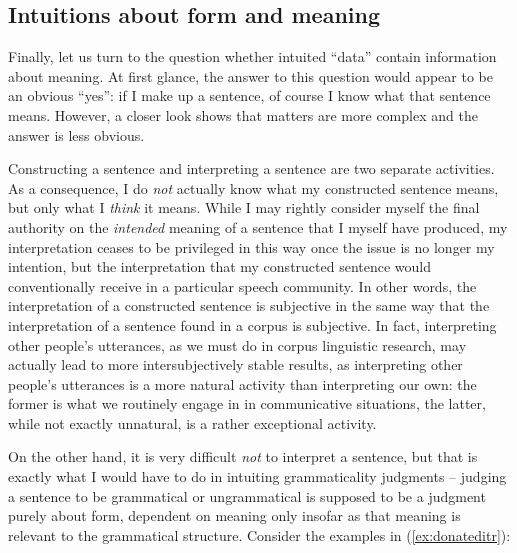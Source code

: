 \subsection{Intuitions about form and meaning}
\label{sec:intuitionsaboutformandmeaning}

Finally, let us turn to the question whether intuited  ``data'' contain information about meaning.  At first glance, the answer to this question would appear to be an obvious ``yes'': if I make up a sentence, of course I know what that sentence means. However, a closer look shows that matters are more complex and the answer is less obvious.

Constructing a sentence and interpreting a sentence are two separate activities. As a consequence, I do \textit{not} actually know what my constructed sentence means, but only what I \textit{think} it means. While I may rightly consider myself the final authority on the \textit{intended} meaning  of a sentence that I myself have produced, my interpretation ceases to be privileged in this way once the issue is no longer my intention, but the interpretation that my constructed sentence would conventionally  receive in a particular speech community. In other words, the interpretation of a constructed sentence is subjective in the same way that the interpretation of a sentence found in a corpus is subjective. In fact, interpreting other people's utterances, as we must do in corpus linguistic research, may actually lead to more intersubjectively stable results, as interpreting other people's utterances is a more natural activity than interpreting our own: the former is what we routinely engage in in communicative situations, the latter, while not exactly unnatural, is a rather exceptional activity.

On the other hand, it is very difficult \emph{not} to interpret a sentence, but that is exactly what I would have to do in intuiting  grammaticality  judgments -- judging a sentence to be grammatical or ungrammatical  is supposed to be a judgment purely about form, dependent on meaning  only insofar as that meaning is relevant to the grammatical structure. Consider the examples in (\ref{ex:donateditr}):

